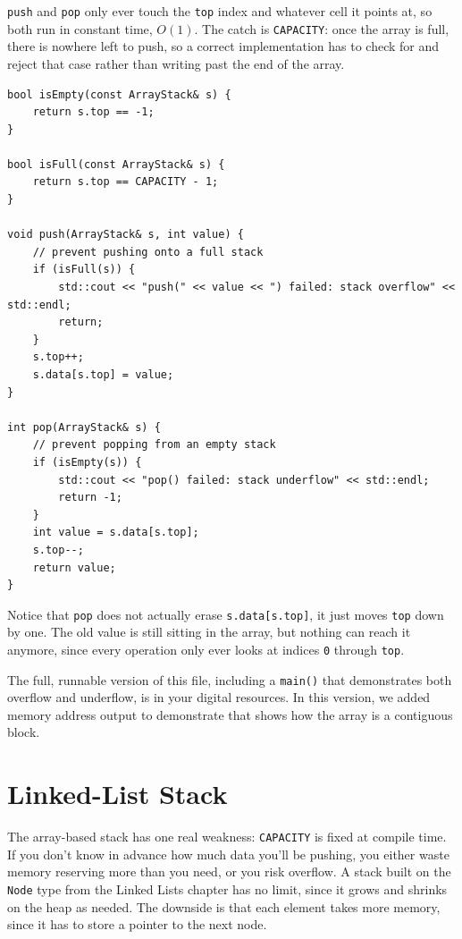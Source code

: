 \texttt{push} and \texttt{pop} only ever touch the \texttt{top} index and whatever cell it points at, so both run in constant time, $O(1)$. The catch is \texttt{CAPACITY}: once the array is full, there is nowhere left to push, so a correct implementation has to check for and reject that case rather than writing past the end of the array.

\begin{verbatim}
bool isEmpty(const ArrayStack& s) {
    return s.top == -1;
}

bool isFull(const ArrayStack& s) {
    return s.top == CAPACITY - 1;
}

void push(ArrayStack& s, int value) {
    // prevent pushing onto a full stack
    if (isFull(s)) {
        std::cout << "push(" << value << ") failed: stack overflow" << std::endl;
        return;
    }
    s.top++;
    s.data[s.top] = value;
}

int pop(ArrayStack& s) {
    // prevent popping from an empty stack
    if (isEmpty(s)) {
        std::cout << "pop() failed: stack underflow" << std::endl;
        return -1;
    }
    int value = s.data[s.top];
    s.top--;
    return value;
}
\end{verbatim}

Notice that \texttt{pop} does not actually erase \texttt{s.data[s.top]},
it just moves \texttt{top} down by one. The old value is still sitting
in the array, but nothing can reach it anymore, since every operation 
only ever looks at indices \texttt{0} through \texttt{top}. 

The full, 
runnable version of this file, including a \texttt{main()} that 
demonstrates both overflow and underflow, is in your digital resources. In this version, we added memory address output to demonstrate that shows how the array is a contiguous block.

\section{Linked-List Stack}

The array-based stack has one real weakness: \texttt{CAPACITY} is fixed at compile time. If you don't know in advance how much data you'll be pushing, you either waste memory reserving more than you need, or you risk overflow. A stack built on the \texttt{Node} type from the Linked Lists chapter has no limit, since it grows and shrinks on the heap as needed. The downside is that each element takes more memory, since it has to store a pointer to the next node.

